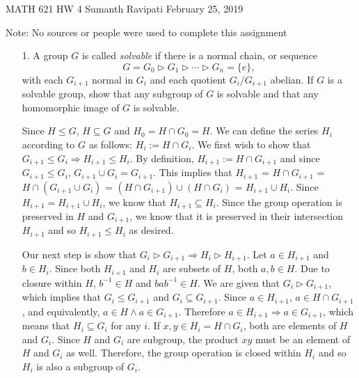 \documentclass[12pt,letterpaper,reqno]{amsart}
\begin{document}
\thispagestyle{empty}
\begin{center}\large{
    MATH 621\quad
    HW 4\quad
    Sumanth Ravipati\quad
    February 25, 2019}
\end{center}
\vspace{.15in}
\begin{flushleft}
Note: No sources or people were used to complete this assignment
\end{flushleft}
\vspace{.25in}

\begin{enumerate}
\item[1.] A group $G$ is called \textit{solvable} if there is a normal chain, or sequence
$$G = G_0 \triangleright G_1 \triangleright \cdots \triangleright G_n = \{ e \},$$
with each $G_{i+1}$ normal in $G_i$ and each quotient $G_i/G_{i+1}$ abelian. If $G$ is a solvable group, show that any subgroup of $G$ is solvable and that any homomorphic image of $G$ is solvable.
\newline

\begin{flushleft}
Since $H \leq G$, $H \subseteq G$ and $H_0 = H \cap G_0 = H$. We can define the series $H_i$ according to $G$ as follows: $H_i := H \cap G_i$. We first wish to show that $G_{i+1} \leq G_i \Rightarrow H_{i+1} \leq H_i$. By definition, $H_{i+1} := H \cap G_{i+1}$ and since $G_{i+1} \leq G_i$, $G_{i+1} \cup G_i = G_{i+1}$. This implies that $H_{i+1}$ = $H \cap G_{i+1}$ = $H \cap (G_{i+1} \cup G_i)$ = $(H \cap G_{i+1}) \cup (H \cap G_i)$ = $H_{i+1} \cup H_i$. Since $H_{i+1} = H_{i+1} \cup H_i$, we know that $H_{i+1} \subseteq H_i$. Since the group operation is preserved in $H$ and $G_{i+1}$, we know that it is preserved in their intersection $H_{i+1}$ and so $H_{i+1} \leq H_i$ as desired.
\newline

Our next step is show that $G_i \triangleright G_{i+1} \Rightarrow H_i \triangleright H_{i+1}$. Let $a \in H_{i+1}$ and $b \in H_i$. Since both $H_{i+1}$ and $H_i$ are subsets of $H$, both $a, b \in H$. Due to closure within $H$, $b^{-1} \in H$ and $bab^{-1} \in H$. We are given that $G_i \triangleright G_{i+1}$, which implies that $G_i \leq G_{i+1}$ and $G_i \subseteq G_{i+1}$. Since $a \in H_{i+1}$, $a \in H \cap G_{i+1}$, and equivalently, $a \in H \wedge a \in G_{i+1}$. Therefore $a \in H_{i+1} \Rightarrow a \in G_{i+1}$, which means that $H_i \subseteq G_i$ for any $i$. If $x, y \in H_i = H \cap G_i$, both are elements of $H$ and $G_i$. Since $H$ and $G_i$ are subgroup, the product $xy$ must be an element of $H$ and $G_i$ as well. Therefore, the group operation is closed within $H_i$ and so $H_i$ is also a subgroup of $G_i$.
\newline


\end{flushleft}
\end{enumerate}
\end{document}
